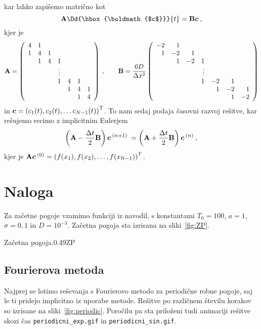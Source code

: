 \documentclass{porocilo}
\newcommand{\bi}[1]{\hbox{\boldmath{$#1$}}}
\begin{document}
kar lahko zapišemo matrično kot
\[
    \mathbf{A} \Dd{\bi{c}}{t} = \mathbf{B} \bi{c} \>,
\]
kjer je
\[
    \mathbf{A} = \left(
    \begin{array}{ccccccc}
            4 & 1 \cr
            1 & 4     & 1 \cr
              & 1     & 4     & 1 \cr
              &       &       & \vdots \cr
              &       &       & 1          & 4 & 1 & \cr
              &       &       &            & 1 & 4 & 1 \cr
              &       &       &            &   & 1 & 4
        \end{array}
    \right) \>, \qquad
    \mathbf{B} = {\frac{6 D}{\Delta{x^2}}} \left({
        \begin{array}{rrrrrrr}
            -2 & 1 \cr
            1  & -2    & 1 \cr
               & 1     & -2    & 1 \cr
               &       &       & \vdots \cr
               &       &       & 1          & -2 & 1  & \cr
               &       &       &            & 1  & -2 & 1 \cr
               &       &       &            &    & 1  & -2
        \end{array}
    }\right)
\]
in $\bi{c} = {(c_1(t), c_2(t), \ldots c_{N-1}(t))}^\mathrm{T}$.
To nam sedaj podaja časovni razvoj rešitve, kar rešujemo recimo z implicitnim Eulerjem
\[
    \left( \mathbf{A} - \frac{\Delta t}{2}{ \mathbf{B}}\right)\bi{c}^{\>(n+1)} \>
    = \left( \mathbf{A} + \frac{\Delta t}{2}{ \mathbf{B}}\right)\bi{c}^{\>(n)} \>,
\]
kjer je $\mathbf{A}\bi{c}^{\>(0)} = {(f(x_{\rm 1}), f(x_{\rm 2}), \dots , f(x_{\rm N-1}))}^T$.

\section{Naloga}
Za začetne pogoje vzamimo funkciji iz navodil, s konstantami $T_0 = 100$, $a = 1$, $\sigma = 0,1$ in $D = 10^{-3}$. Začetna pogoja sta izrisana na sliki~\ref{fig:ZP}.

\begin{multifig}{2}{Začetna pogoja.}{0.49}{ZP}
\end{multifig}

\newpage
\subsection{Fourierova metoda}
Najprej se lotimo reševanja s Fourierovo metodo za periodične robne pogoje, saj le ti pridejo implicitno iz uporabe metode. Rešitve po različnem številu korakov so izrisane na sliki~\ref{fig:periodic}. Poročilu pa sta priloženi tudi animaciji rešitve skozi čas \texttt{periodicni\_exp.gif} in \texttt{periodicni\_sin.gif}.
\end{document}
